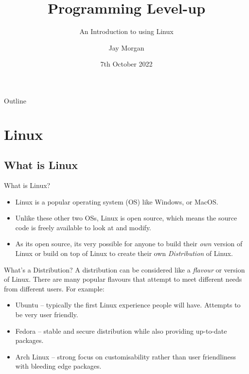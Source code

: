 \documentclass[10pt]{beamer}
\author{Jay Morgan}
\date{7th October 2022}
\title{Programming Level-up}
\subtitle{An Introduction to using Linux}
\begin{document}
\maketitle
\begin{frame}{Outline}
\tableofcontents
\end{frame}


\section{Linux}
\label{sec:orgeba7454}

\subsection{What is Linux}
\label{sec:orgc7abd5c}

\begin{frame}[label={sec:orgc74f04e}]{What is Linux?}
\begin{itemize}
\item Linux is a popular operating system (OS) like Windows, or MacOS.
\item Unlike these other two OSs, Linux is open source, which means the source code
is freely available to look at and modify.
\item As its open source, its very possible for anyone to build their \emph{own} version of
Linux or build on top of Linux to create their own \emph{Distribution} of Linux.
\end{itemize}
\end{frame}

\begin{frame}[label={sec:orgafb4ee1}]{What's a Distribution?}
A distribution can be considered like a \emph{flavour} or version of Linux. There are
many popular flavours that attempt to meet different needs from different
users. For example:

\begin{itemize}
\item Ubuntu -- typically the first Linux experience people will have. Attempts to be
very user friendly.
\item Fedora -- stable and secure distribution while also providing up-to-date packages.
\item Arch Linux -- strong focus on customisability rather than user friendliness
with bleeding edge packages.
\end{itemize}
\end{frame}
\end{document}
